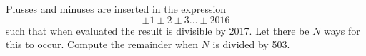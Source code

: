 Plusses and minuses are inserted in the expression \[\pm 1 \pm 2 \pm 3 \dots \pm 2016\] such that when evaluated the result is divisible by 2017. Let there be $N$ ways for this to occur. Compute the remainder when $N$ is divided by 503.